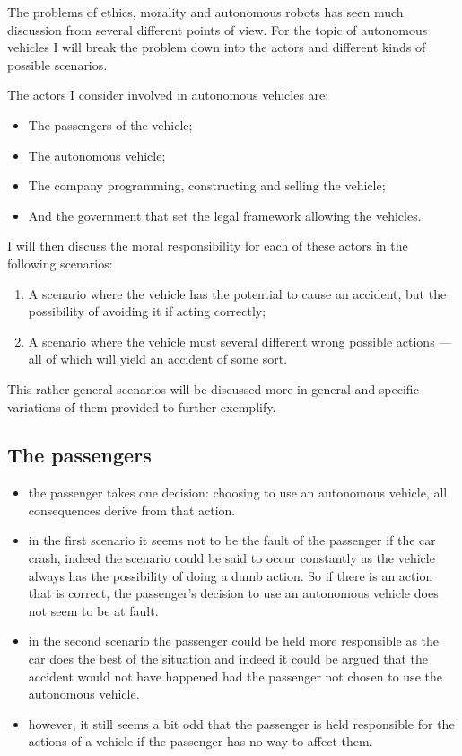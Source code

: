 The problems of ethics, morality and autonomous robots has seen much discussion
from several different points of view. For the topic of autonomous vehicles I
will break the problem down into the actors and different kinds of possible scenarios.

The actors I consider involved in autonomous vehicles are:
\begin{itemize}
\item The passengers of the vehicle;
\item The autonomous vehicle;
\item The company programming, constructing and selling the vehicle;
\item And the government that set the legal framework allowing the vehicles.
\end{itemize}

I will then discuss the moral responsibility for each of these actors in the
following scenarios:
\begin{enumerate}
\item A scenario where the vehicle has the potential to cause an accident, but
  the possibility of avoiding it if acting correctly;
\item A scenario where the vehicle must several different wrong possible actions
  --- all of which will yield an accident of some sort.
\end{enumerate}

This rather general scenarios will be discussed more in general and specific
variations of them provided to further exemplify.

\subsection{The passengers}
\begin{itemize}
\item the passenger takes one decision: choosing to use an autonomous vehicle,
  all consequences derive from that action.
\item in the first scenario it seems not
  to be the fault of the passenger if the car crash, indeed the scenario could
  be said to occur constantly as the vehicle always has the possibility of doing
  a dumb action. So if there is an action that is correct, the passenger's
  decision to use an autonomous vehicle does not seem to be at fault.
\item in the second scenario the passenger could be held more responsible as the car does
  the best of the situation and indeed it could be argued that the accident
  would not have happened had the passenger not chosen to use the autonomous
  vehicle.
\item however, it still seems a bit odd that the passenger is held
  responsible for the actions of a vehicle if the passenger has no way to affect
  them.
\end{itemize}
